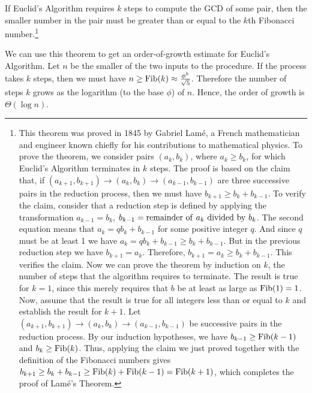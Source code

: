 \begin{theorem}
  If Euclid's Algorithm requires $k$ steps to compute the GCD of some
  pair, then the smaller number in the pair must be greater than or
  equal to the $k$th Fibonacci number.\footnote{This theorem was
    proved in 1845 by Gabriel Lam\'e, a French mathematician and
    engineer known chiefly for his contributions to mathematical
    physics.  To prove the theorem, we consider pairs $(a_{k}
    ,b_{k})$, where $a_k \ge b_k$, for which Euclid's Algorithm
    terminates in $k$ steps.  The proof is based on the claim that, if
    $(a_{k+1}, b_{k+1}) \rightarrow (a_k, b_k) \rightarrow (a_{k-1},
    b_{k-1})$ are three successive pairs in the reduction process,
    then we must have $b_{k+1} \ge b_k + b_{k-1}$.  To verify the
    claim, consider that a reduction step is defined by applying the
    transformation $a_{k-1} = b_k$, $b_{k-1} = {\rm remainder~of~} a_k
    {\rm ~divided~by~} b_k$.  The second equation means that $a_k =
    qb_k + b_{k-1}$ for some positive integer $q$.  And since $q$ must
    be at least 1 we have $a_k = qb_k + b_{k-1} \ge b_k + b_{k-1}$.
    But in the previous reduction step we have $b_{k+1} = a_k$.
    Therefore, $b_{k+1} = a_k \ge b_k + b_{k-1}$.  This verifies the
    claim.  Now we can prove the theorem by induction on $k$, the
    number of steps that the algorithm requires to terminate.  The
    result is true for $k = 1$, since this merely requires that $b$ be
    at least as large as ${\rm Fib}(1) = 1$.  Now, assume that the
    result is true for all integers less than or equal to $k$ and
    establish the result for $k + 1$.  Let $(a_{k+1}, b_{k+1})
    \rightarrow (a_k, b_k) \rightarrow (a_{k-1}, b_{k-1})$ be
    successive pairs in the reduction process.  By our induction
    hypotheses, we have $b_{k-1} \ge {\rm Fib}(k - 1)$ and $b_k \ge
    {\rm Fib}(k)$.  Thus, applying the claim we just proved together
    with the definition of the Fibonacci numbers gives $b_{k+1} \ge
    b_k + b_{k-1} \ge {\rm Fib}(k) + {\rm Fib}(k - 1) = {\rm
      Fib}(k+1)$, which completes the proof of Lam\'e's Theorem.}
\end{theorem}



We can use this theorem to get an order-of-growth estimate for Euclid's
Algorithm.  Let $n$ be the smaller of the two inputs to the
procedure.  If the process takes $k$ steps, then we must have 
$n \ge {\rm Fib}(k) \approx \frac{\phi^k}{\sqrt 5}$.  Therefore
the number of steps $k$ grows as the logarithm (to the base
$\phi$) of $n$.  Hence, the order of growth is $\Theta(\log n)$.

